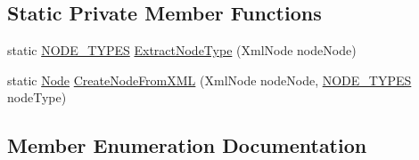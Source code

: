 \subsection*{Static Private Member Functions}
\begin{DoxyCompactItemize}
\item 
static \hyperlink{class_web_analyzer_1_1_models_1_1_settings_model_1_1_expression_tree_1_1_node_a89c72b19ff778cbc04788f4cb47a730e}{N\+O\+D\+E\+\_\+\+T\+Y\+P\+E\+S} \hyperlink{class_web_analyzer_1_1_models_1_1_settings_model_1_1_expression_tree_1_1_node_ae1efb2639fc04b709b1adbd3566a8162}{Extract\+Node\+Type} (Xml\+Node node\+Node)
\item 
static \hyperlink{class_web_analyzer_1_1_models_1_1_settings_model_1_1_expression_tree_1_1_node}{Node} \hyperlink{class_web_analyzer_1_1_models_1_1_settings_model_1_1_expression_tree_1_1_node_a1ca08dcd343feb5bf309c2702fcfa46e}{Create\+Node\+From\+X\+M\+L} (Xml\+Node node\+Node, \hyperlink{class_web_analyzer_1_1_models_1_1_settings_model_1_1_expression_tree_1_1_node_a89c72b19ff778cbc04788f4cb47a730e}{N\+O\+D\+E\+\_\+\+T\+Y\+P\+E\+S} node\+Type)
\end{DoxyCompactItemize}


\subsection{Member Enumeration Documentation}
\hypertarget{class_web_analyzer_1_1_models_1_1_settings_model_1_1_expression_tree_1_1_node_a89c72b19ff778cbc04788f4cb47a730e}{}
